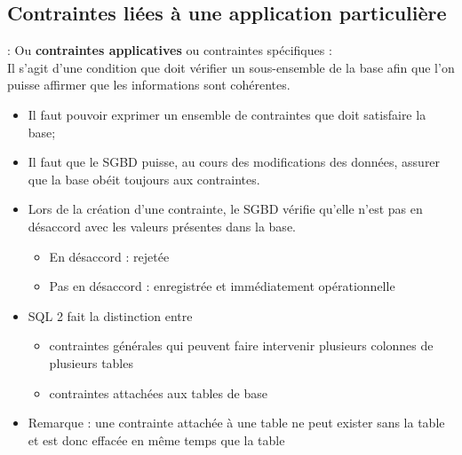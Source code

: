 \documentclass[10pt]{beamer}
\begin{document}
\subsection{Contraintes liées à une application particulière}
\begin{frame}{\secname : \subsecname}
    Ou \textbf{contraintes applicatives} ou contraintes spécifiques :\\
    Il s'agit d'une condition que doit vérifier un sous-ensemble de la base afin que l'on puisse affirmer que les informations sont cohérentes.
\end{frame}

\begin{frame}{\secname}
    \begin{itemize}
        \item Il faut pouvoir exprimer un ensemble de contraintes que doit satisfaire la base;
        \item Il faut que le SGBD puisse, au cours des modifications des données, assurer que la base obéit toujours aux contraintes.
        \item Lors de la création d'une contrainte, le SGBD vérifie qu'elle n'est pas en désaccord avec les valeurs présentes dans la base.
              \begin{itemize}
                  \item En désaccord : rejetée
                  \item Pas en désaccord : enregistrée et immédiatement opérationnelle
              \end{itemize}
    \end{itemize}
\end{frame}

\begin{frame}{\secname}
    \begin{itemize}
        \item SQL 2 fait la distinction entre
              \begin{itemize}
                  \item contraintes générales qui peuvent faire intervenir plusieurs colonnes de plusieurs tables
                  \item contraintes attachées aux tables de base
              \end{itemize}
        \item Remarque : une contrainte attachée à une table ne peut exister sans la table et est donc effacée en même temps que la table
    \end{itemize}
\end{frame}
\end{document}
